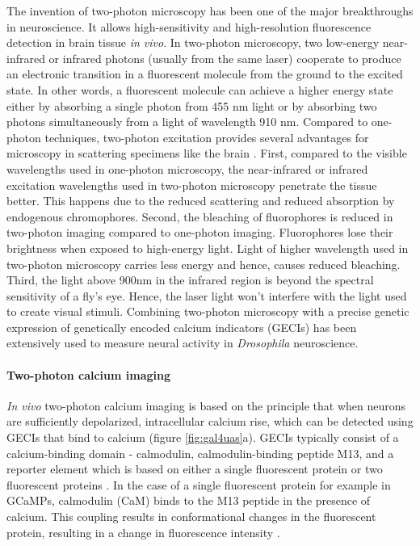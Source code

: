 The invention of two-photon microscopy \parencite{Denk1990} has been one of the major breakthroughs in neuroscience. It allows high-sensitivity and high-resolution fluorescence detection in brain tissue \textit{in vivo}. In two-photon microscopy, two low-energy near-infrared or infrared photons (usually from the same laser) cooperate to produce an electronic transition in a fluorescent molecule from the ground to the excited state. In other words, a fluorescent molecule can achieve a higher energy state either by absorbing a single photon from 455 nm light or by absorbing two photons simultaneously from a light of wavelength 910 nm. Compared to one-photon techniques, two-photon excitation provides several advantages for microscopy in scattering specimens like the brain \parencite{Denk1994, Svoboda2006}. First, compared to the visible wavelengths used in one-photon microscopy, the near-infrared or infrared excitation wavelengths used in two-photon microscopy penetrate the tissue better. This happens due to the reduced scattering and reduced absorption by endogenous chromophores. Second, the bleaching of fluorophores is reduced in two-photon imaging compared to one-photon imaging. Fluorophores lose their brightness when exposed to high-energy light. Light of higher wavelength used in two-photon microscopy carries less energy and hence, causes reduced bleaching. Third, the light above 900nm in the infrared region is beyond the spectral sensitivity of a fly’s eye. Hence, the laser light won’t interfere with the light used to create visual stimuli. Combining two-photon microscopy with a precise genetic expression of genetically encoded calcium indicators (GECIs) \parencite{Chen2013} has been extensively used to measure neural activity in \textit{Drosophila} neuroscience. 

\paragraph{Two-photon calcium imaging}
\textit{In vivo} two-photon calcium imaging is based on the principle that when neurons are sufficiently depolarized, intracellular calcium rise, which can be detected using GECIs that bind to calcium (figure \ref{fig:gal4uas}a). GECIs typically consist of a calcium-binding domain - calmodulin, calmodulin-binding peptide M13, and a reporter element which is based on either a single fluorescent protein or two fluorescent proteins \parencite{Broussard2014}. In the case of a single fluorescent protein for example in GCaMPs, calmodulin (CaM) binds to the M13 peptide in the presence of calcium. This coupling results in conformational changes in the fluorescent protein, resulting in a change in fluorescence intensity \parencite{Nagai2001}.

